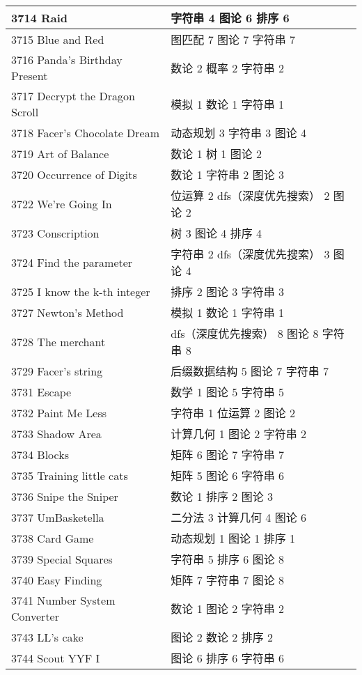 \begin{longtable}{| p{} | p{} |}
 3714 Raid  & 字符串 4 图论 6 排序 6 \\ \hline
 3715 Blue and Red  & 图匹配 7 图论 7 字符串 7 \\ \hline
 3716 Panda's Birthday Present  & 数论 2 概率 2 字符串 2 \\ \hline
 3717 Decrypt the Dragon Scroll  & 模拟 1 数论 1 字符串 1 \\ \hline
 3718 Facer's Chocolate Dream  & 动态规划 3 字符串 3 图论 4 \\ \hline
 3719 Art of Balance  & 数论 1 树 1 图论 2 \\ \hline
 3720 Occurrence of Digits  & 数论 1 字符串 2 图论 3 \\ \hline
 3722 We're Going In  & 位运算 2 dfs（深度优先搜索） 2 图论 2 \\ \hline
 3723 Conscription  & 树 3 图论 4 排序 4 \\ \hline
 3724 Find the parameter  & 字符串 2 dfs（深度优先搜索） 3 图论 4 \\ \hline
 3725 I know the k-th integer  & 排序 2 图论 3 字符串 3 \\ \hline
 3727 Newton’s Method  & 模拟 1 数论 1 字符串 1 \\ \hline
 3728 The merchant  & dfs（深度优先搜索） 8 图论 8 字符串 8 \\ \hline
 3729 Facer’s string  & 后缀数据结构 5 图论 7 字符串 7 \\ \hline
 3731 Escape  & 数学 1 图论 5 字符串 5 \\ \hline
 3732 Paint Me Less  & 字符串 1 位运算 2 图论 2 \\ \hline
 3733 Shadow Area  & 计算几何 1 图论 2 字符串 2 \\ \hline
 3734 Blocks  & 矩阵 6 图论 7 字符串 7 \\ \hline
 3735 Training little cats  & 矩阵 5 图论 6 字符串 6 \\ \hline
 3736 Snipe the Sniper  & 数论 1 排序 2 图论 3 \\ \hline
 3737 UmBasketella  & 二分法 3 计算几何 4 图论 6 \\ \hline
 3738 Card Game  & 动态规划 1 图论 1 排序 1 \\ \hline
 3739 Special Squares  & 字符串 5 排序 6 图论 8 \\ \hline
 3740 Easy Finding  & 矩阵 7 字符串 7 图论 8 \\ \hline
 3741 Number System Converter  & 数论 1 图论 2 字符串 2 \\ \hline
 3743 LL’s cake  & 图论 2 数论 2 排序 2 \\ \hline
 3744 Scout YYF I  & 图论 6 排序 6 字符串 6 \\ \hline

\end{longtable}

